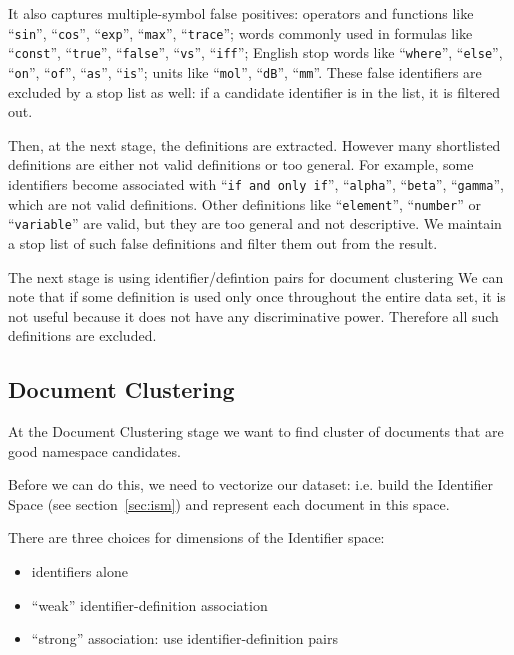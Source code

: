 It also captures multiple-symbol false positives: operators and functions
like ``\texttt{sin}'', ``\texttt{cos}'', ``\texttt{exp}'', ``\texttt{max}'', ``\texttt{trace}''; 
words commonly used in formulas like ``\texttt{const}'', ``\texttt{true}'', ``\texttt{false}'',
``\texttt{vs}'', ``\texttt{iff}''; English stop words like ``\texttt{where}'', ``\texttt{else}'',
``\texttt{on}'', ``\texttt{of}'', ``\texttt{as}'', ``\texttt{is}''; 
units like ``\texttt{mol}'', ``\texttt{dB}'', ``\texttt{mm}''.
These false identifiers are excluded by a stop list as well: if a
candidate identifier is in the list, it is filtered out.


Then, at the next stage, the definitions are extracted. However many 
shortlisted definitions are either not valid definitions or too general. 
For example, some identifiers become associated with ``\texttt{if and only if}'', 
``\texttt{alpha}'', ``\texttt{beta}'', ``\texttt{gamma}'', which are not valid definitions. 
Other definitions like ``\texttt{element}'', ``\texttt{number}'' or 
``\texttt{variable}'' are valid, but
they are too general and not descriptive. We maintain a stop list of such 
false definitions and filter them out from the result. 

The next stage is using identifier/defintion pairs for document clustering
We can note that if some definition is used only once throughout the entire
data set, it is not useful because it does not have any discriminative power.
Therefore all such definitions are excluded.


\subsection{Document Clustering} \label{sec:clustering-impl}

At the Document Clustering stage we want to find cluster of documents 
that are good namespace candidates. 

Before we can do this, we need to vectorize our dataset: i.e. build the 
Identifier Space (see section~\ref{sec:ism}) and represent each document 
in this space. 

There are three choices for dimensions of the Identifier space: 

\begin{itemize}
  \item identifiers alone
  \item ``weak'' identifier-definition association
  \item ``strong'' association: use identifier-definition pairs
\end{itemize}

